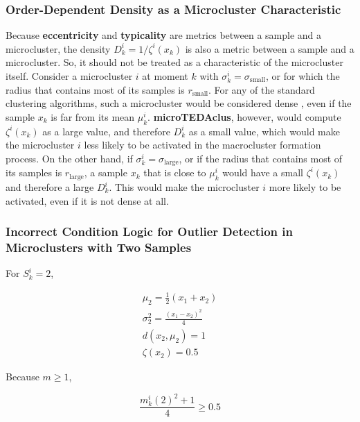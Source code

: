 \documentclass[a4paper]{article}
\begin{document}
\subsubsection{Order-Dependent Density as a Microcluster Characteristic} \label{sss:order_dependent_characteristics}

Because \textbf{eccentricity} and \textbf{typicality} are metrics between a sample and a microcluster, the density $D^i_k = 1 / \zeta^i(x_k)$ is also a metric between a sample and a microcluster. So, it should not be treated as a characteristic of the microcluster itself. Consider a microcluster $i$ at moment $k$ with $\sigma^i_k = \sigma_\text{small}$, or for which the radius that contains most of its samples is $r_\text{small}$. For any of the standard clustering algorithms, such a microcluster would be considered dense \cite{ester1996density, aggarwal2003framework, cao2006density}, even if the sample $x_k$ is far from its mean $\mu^i_k$. \textbf{microTEDAclus}, however, would compute $\zeta^i(x_k)$ as a large value, and therefore $D^i_k$ as a small value, which would make the microcluster $i$ less likely to be activated in the macrocluster formation process. On the other hand, if $\sigma^i_k = \sigma_\text{large}$, or if the radius that contains most of its samples is $r_\text{large}$, a sample $x_k$ that is close to $\mu^i_k$ would have a small $\zeta^i(x_k)$ and therefore a large $D^i_k$. This would make the microcluster $i$ more likely to be activated, even if it is not dense at all.

\subsubsection{Incorrect Condition Logic for Outlier Detection in Microclusters with Two Samples} \label{sss:incorrect_condition_logic}

For $S^i_k = 2$,

\begin{gather}
    \mu_2 = \frac{1}{2} \left( x_1 + x_2 \right) \\
    \sigma^2_2 = \frac{\left(x_1 - x_2\right)^2}{4} \\
    d(x_2, \mu_2) = 1 \\
    \zeta(x_2) = 0.5
\end{gather}

Because $m \ge 1$,

\begin{equation}
    \frac{m^i_k(2)^2 + 1}{4} \ge 0.5
\end{equation}
\end{document}
